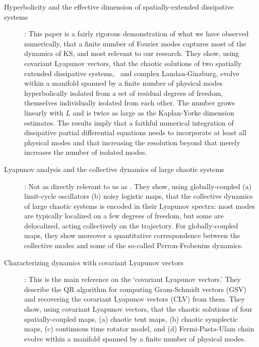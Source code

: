 \begin{description}
\item[Hyperbolicity and the effective dimension of
           spatially-extended dissipative systems]:
  This paper is a fairly rigorous demonstration of what we
  have observed numerically, that a finite number of Fourier modes
  captures most of the dynamics of KS, and most relevant to our research.
 They show, using covariant Lyapunov vectors, that
  the chaotic solutions of two spatially extended dissipative
  systems, \KS\ and complex Landau-Ginzburg,
  evolve within a manifold spanned by a finite number
  of physical modes hyperbolically isolated from a set of
  residual degrees of freedom, themselves individually
  isolated from each other. The number grows linearly with
  $L$ and is twice as large as the Kaplan-Yorke dimension estimates.
  The results imply that a
  faithful numerical integration of dissipative
  partial differential equations needs to incorporate at
  least all physical modes and that increasing the resolution
  beyond that
  merely increases the number of isolated modes.

\item[Lyapunov analysis and the collective dynamics of
           large chaotic systems]:
  Not as directly relevant to us as .
  They show, using globally-coupled
  (a) limit-cycle oscillators
  (b) noisy logistic maps,
  that the collective dynamics of large chaotic
  systems is encoded in their Lyapunov spectra: most modes
  are typically localized on a few degrees of freedom, but
  some are delocalized, acting collectively on the
  trajectory. For globally-coupled maps, they show moreover a
  quantitative correspondence between the collective modes
  and some of the so-called Perron-Frobenius dynamics.

\item[Characterizing dynamics with covariant Lyapunov
              vectors]:
This is the main reference on the
`covariant Lyapunov vectors.' They describe the QR algorithm for
computing Gram-Schmidt vectors (GSV) and recovering
the covariant Lyapunov vectors (CLV) from them.
They show, using covariant Lyapunov vectors, that
  the chaotic solutions of four spatially-coupled maps,
(a) chaotic tent maps,
(b) chaotic symplectic maps,
(c) continuous time rotator model, and
(d) Fermi-Pasta-Ulam chain
  evolve within a manifold spanned by a finite number
  of physical modes.


\end{description}
